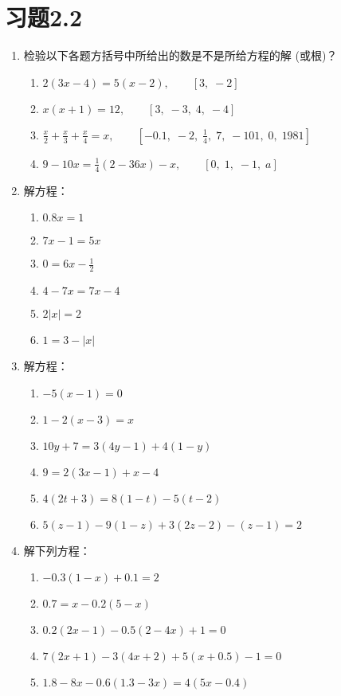 \section*{习题2.2}

\begin{enumerate}
\item 检验以下各题方括号中所给出的数是不是所给方程的解
(或根)？
\begin{enumerate}
    \item $2 (3x-4)=5(x-2),\qquad [3,\; -2]$
    \item $ x(x+ 1)=12,\qquad [3,\; -3,\; 4,\; -4]$
    \item $\frac{x}{2}+\frac{x}{3}+\frac{x}{4}=x,\qquad \left[-0.1,\; -2,\; \frac{1}{4},\; 7,\; -101,\; 0,\; 1981\right]$
    \item $9-10x=\frac{1}{4}(2-36x)-x,\qquad [0,\; 1,\; -1,\; a]$
\end{enumerate}

\item 解方程：
\begin{multicols}{2}
\begin{enumerate}
    \item $0.8x=1$
    \item $7x-1=5x$
    \item $0=6x-\frac{1}{2}$
    \item $4-7x=7x-4$
    \item $2|x|=2$
    \item $1=3-|x|$
\end{enumerate}
\end{multicols}

\item 解方程：
\begin{enumerate}
    \item $-5(x-1)=0$
    \item $1-2(x-3)=x$
    \item $10y+7=3(4y-1)+4(1-y)$
    \item $9=2(3x-1)+x-4$
    \item $4(2t+3)=8(1-t)-5(t-2)$
    \item $5(z-1)-9(1-z)+3(2z-2)-(z-1)=2$
\end{enumerate}

\item 解下列方程：
\begin{enumerate}
    \item $-0.3(1-x)+0.1=2$
    \item $0.7=x-0.2(5-x)$
    \item $0.2(2x-1)-0.5(2-4x)+1=0$
    \item $7(2x+1)-3(4x+2)+5(x+0.5)-1=0$
    \item $1.8-8x-0.6(1.3-3x)=4(5x-0.4)$
\end{enumerate}


\end{enumerate}
